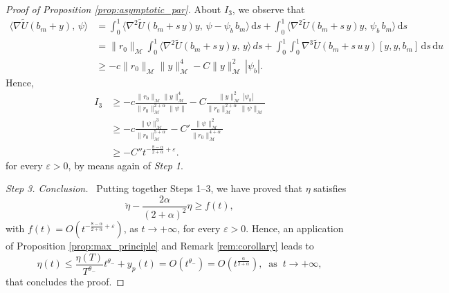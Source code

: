 \documentclass[10pt,a4paper]{amsart}
\newcommand{\ud}{\mathrm{d}}
\begin{document}
\begin{proof}[Proof of Proposition \ref{prop:asymptotic_par}]
About $I_3$, we observe that
\[
\begin{aligned}
    \langle \nabla \tilde U(b_m+y),\,\psi\rangle &= \int_0^1 \langle\nabla^2 \tilde U(b_m+s\,y)y,\,\psi-\psi_b\,b_m \rangle\,\ud s + \int_0^1\langle \nabla^2 \tilde U(b_m+s\,y)y,\,\psi_b\,b_m\rangle\,\ud s 
    \\
    & = \|r_0\|_\mathcal{M}\int_0^1 \langle\nabla^2 \tilde U(b_m+s\,y)y,\,y \rangle\,ds +\int_0^1\int_0^1 \nabla^3 \tilde U(b_m+s\,u\,y)[y,y,b_m]\,\ud s\,\ud u
    \\
    &\ge -c \|r_0\|_\mathcal{M}\|y\|_\mathcal{M}^4 -C \|y\|_\mathcal{M}^2\,|\psi_b|.
\end{aligned}
\]
Hence,
\[
\begin{aligned}
I_3 &\ge  -c \frac{\|r_0\|_\mathcal{M}\|y\|_\mathcal{M}^4}{\|r_0\|_\mathcal{M}^{2+\alpha}\|\psi\|} -C \frac{\|y\|_\mathcal{M}^2\,|\psi_b|}{\|r_0\|_\mathcal{M}^{2+\alpha}\,\|\psi\|_\mathcal{M}}
\\
&\ge -c \frac{\|\psi\|_\mathcal{M}^3}{\|r_0\|_\mathcal{M}^{5+\alpha}}-C'\frac{\|\psi\|_\mathcal{M}^2}{\|r_0\|_\mathcal{M}^{4+\alpha}}
\\
&\ge -C'' t^{-\frac{8-\alpha}{2+\alpha}+\varepsilon}.
\end{aligned}
\]
for every $\varepsilon>0$, by means again of {\em Step 1}.

\smallskip
\emph{Step 3. Conclusion.}
\ Putting together Steps 1--3, we have proved that $\eta$ satisfies
\[
\ddot \eta -\frac{2\alpha}{(2+\alpha)^2}\eta \ge f(t), 
\]
with $f(t)=O(t^{-\frac{8-\alpha}{2+\alpha}+\varepsilon})$, as $t\rightarrow+\infty$, for every $\varepsilon>0$. Hence, an application of Proposition \ref{prop:max_principle} and Remark \ref{rem:corollary} leads to  
\[
\eta(t) \le \frac{\eta(T)}{T^{\theta_-}}t^{\theta_-} + y_p(t)=O(t^{\theta_-})=O(t^\frac{\alpha}{2+\alpha}), \ \mbox{ as } \ t\rightarrow+\infty,
\]
that concludes the proof.

\end{proof}
\end{document}
